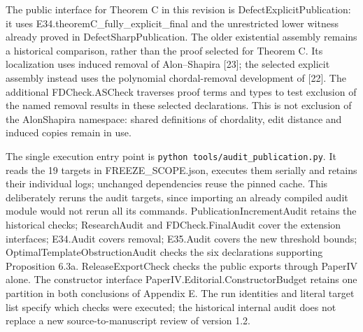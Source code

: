 \documentclass[english,11pt,a4paper]{article}
\begin{document}
The public interface for Theorem C in this revision is DefectExplicitPublication: it uses {\ttfamily\small E34.\discretionary{\hbox{\ensuremath{\hookrightarrow}}}{}{}theoremC\_\discretionary{\hbox{\ensuremath{\hookrightarrow}}}{}{}fully\_\discretionary{\hbox{\ensuremath{\hookrightarrow}}}{}{}explicit\_\discretionary{\hbox{\ensuremath{\hookrightarrow}}}{}{}final} and the unrestricted lower witness already proved in DefectSharpPublication. The older existential assembly remains a historical comparison, rather than the proof selected for Theorem C. Its localization uses induced removal of Alon--Shapira {[}23{]}; the selected explicit assembly instead uses the polynomial chordal-removal development of {[}22{]}. The additional FDCheck.ASCheck traverses proof terms and types to test exclusion of the named removal results in these selected declarations. This is not exclusion of the AlonShapira namespace: shared definitions of chordality, edit distance and induced copies remain in use.

The single execution entry point is \texttt{python\ tools/audit\_publication.py}. It reads the 19 targets in {\ttfamily\small FREEZE\_\discretionary{\hbox{\ensuremath{\hookrightarrow}}}{}{}SCOPE.\discretionary{\hbox{\ensuremath{\hookrightarrow}}}{}{}json}, executes them serially and retains their individual logs; unchanged dependencies reuse the pinned cache. This deliberately reruns the audit targets, since importing an already compiled audit module would not rerun all its commands. PublicationIncrementAudit retains the historical checks; ResearchAudit and FDCheck.FinalAudit cover the extension interfaces; E34.Audit covers removal; E35.Audit covers the new threshold bounds; OptimalTemplateObstructionAudit checks the six declarations supporting Proposition 6.3a. ReleaseExportCheck checks the public exports through PaperIV alone. The constructor interface {\ttfamily\small PaperIV.\discretionary{\hbox{\ensuremath{\hookrightarrow}}}{}{}Editorial.\discretionary{\hbox{\ensuremath{\hookrightarrow}}}{}{}ConstructorB\discretionary{\hbox{\ensuremath{\hookrightarrow}}}{}{}udget} retains one partition in both conclusions of Appendix E. The run identities and literal target list specify which checks were executed; the historical internal audit does not replace a new source-to-manuscript review of version 1.2.
\end{document}
